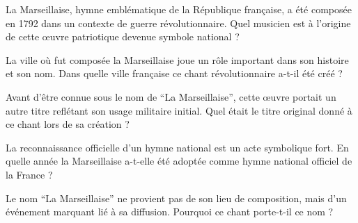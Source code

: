 \startSection
	
	\begin{question}{La Marseillaise, hymne emblématique de la République française, a été composée en 1792 dans un contexte de guerre révolutionnaire. Quel musicien est à l'origine de cette œuvre patriotique devenue symbole national ?}
	\end{question}

	
	\begin{question}{La ville où fut composée la Marseillaise joue un rôle important dans son histoire et son nom. Dans quelle ville française ce chant révolutionnaire a-t-il été créé ?}
	\end{question}

	
	\begin{question}{Avant d’être connue sous le nom de \enquote{La Marseillaise}, cette œuvre portait un autre titre reflétant son usage militaire initial. Quel était le titre original donné à ce chant lors de sa création ?}
	\end{question}

	
	\begin{question}{La reconnaissance officielle d’un hymne national est un acte symbolique fort. En quelle année la Marseillaise a-t-elle été adoptée comme hymne national officiel de la France ?}
	\end{question}

	
	\begin{question}{Le nom \enquote{La Marseillaise} ne provient pas de son lieu de composition, mais d’un événement marquant lié à sa diffusion. Pourquoi ce chant porte-t-il ce nom ?}
	\end{question}
\renderSection
